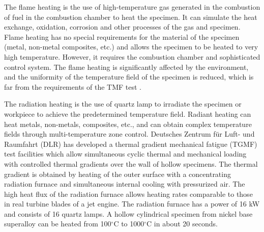 \documentclass[preprint,5p,twocolumn,11pt,sort&compress]{elsarticle}
\begin{document}
The flame heating is the use of high-temperature gas generated in the combustion of fuel in the combustion chamber to heat the specimen. It can simulate the heat exchange, oxidation, corrosion and other processes of the gas and specimen. Flame heating has no special requirements for the material of the specimen (metal, non-metal composites, etc.) and allows the specimen to be heated to very high temperature. However, it requires the combustion chamber and sophisticated control system. The flame heating is significantly affected by the environment, and the uniformity of the temperature field of the specimen is reduced, which is far from the requirements of the TMF test \cite{MAUGET2017225}.

The radiation heating is the use of quartz lamp to irradiate the specimen or workpiece to achieve the predetermined temperature field. Radiant heating can heat metals, non-metals, composites, etc., and can obtain complex temperature fields through multi-temperature zone control.
Deutsches Zentrum f\"{u}r Luft- und Raumfahrt (DLR) \cite{BAUFELD2008219} has developed a thermal gradient mechanical fatigue (TGMF) test facilities which allow simultaneous cyclic thermal and mechanical loading with controlled thermal gradients over the wall of hollow specimens. The thermal gradient is obtained by heating of the outer surface with a concentrating radiation furnace and simultaneous internal cooling with pressurized air. The high heat flux of the radiation furnace allows heating rates comparable to those in real turbine blades of a jet engine. The radiation furnace has a power of 16 kW and consists of 16 quartz lamps. A hollow cylindrical specimen from nickel base superalloy can be heated from 100$^\circ$C to 1000$^\circ$C in about 20 seconds. 
\end{document}
